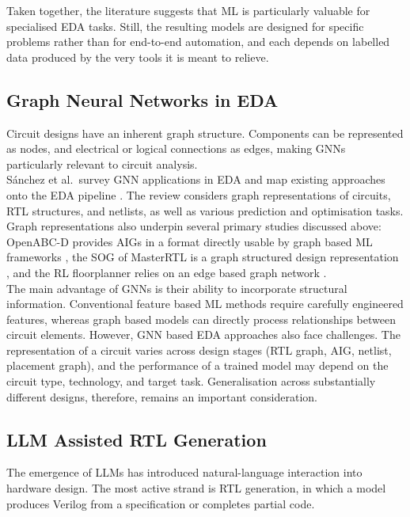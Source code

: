 \documentclass[conference]{IEEEtran}
\begin{document}
\noindent Taken together, the literature suggests that ML is particularly valuable for specialised EDA tasks. Still, the resulting models are designed for specific problems rather than for end-to-end automation, and each depends on labelled data produced by the very tools it is meant to relieve.

\subsection{Graph Neural Networks in EDA}\label{L2}

\noindent Circuit designs have an inherent graph structure. Components can be represented as nodes, and electrical or logical connections as edges, making GNNs particularly relevant to circuit analysis. \\

\noindent S{\'a}nchez et al.\ survey GNN applications in EDA and map existing approaches onto the EDA pipeline \cite{P3_Snchez2023}. The review considers graph representations of circuits, RTL structures, and netlists, as well as various prediction and optimisation tasks. Graph representations also underpin several primary studies discussed above: OpenABC-D provides AIGs in a format directly usable by graph based ML frameworks \cite{P9_Chowdhury2021}, the SOG of MasterRTL is a graph structured design representation \cite{P10_Fang2023}, and the RL floorplanner relies on an edge based graph network \cite{P8_Mirhoseini2021}.\\

\noindent The main advantage of GNNs is their ability to incorporate structural information. Conventional feature based ML methods require carefully engineered features, whereas graph based models can directly process relationships between circuit elements. However, GNN based EDA approaches also face challenges. The representation of a circuit varies across design stages (RTL graph, AIG, netlist, placement graph), and the performance of a trained model may depend on the circuit type, technology, and target task. Generalisation across substantially different designs, therefore, remains an important consideration.

\subsection{LLM Assisted RTL Generation}\label{L3}

\noindent The emergence of LLMs has introduced natural-language interaction into hardware design. The most active strand is RTL generation, in which a model produces Verilog from a specification or completes partial code.\\
\end{document}
